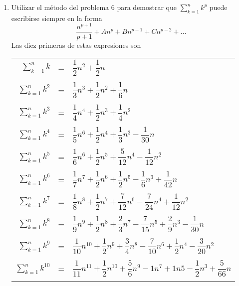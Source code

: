 \begin{enumerate}[\bfseries 1.]
      \item Utilizar el método del problema 6 para demostrar que $\displaystyle\sum_{k=1}^n k^p$ puede escribirse siempre en la forma $$\dfrac{n^{p+1}}{p+1} + An^p + Bn^{p-1} + Cn^{p-2} + ...$$
      Las diez primeras de estas expresiones son
      \begin{center}
      \begin{tabular}{r c l}
      $\displaystyle\sum_{k=1}^n k$&=&$\dfrac{1}{2}n^2 + \dfrac{1}{2}n$\\\\
      $\displaystyle\sum_{k=1}^n k^2$&=&$\dfrac{1}{3} n^3 + \dfrac{1}{2}n^2 + \dfrac{1}{6}n$\\\\
      $\displaystyle\sum_{k=1}^n k^3$&=&$\dfrac{1}{4}n^4 + \dfrac{1}{2} n^3 + \dfrac{1}{4} n^2$\\\\
      $\displaystyle\sum_{k=1}^n k^4$&=&$\dfrac{1}{5} n^6 + \dfrac{1}{2} n^4 + \dfrac{1}{3} n^3 - \dfrac{1}{30}n$\\\\
      $\displaystyle\sum_{k=1}^n k^5$&=&$\dfrac{1}{6}n^6 + \dfrac{1}{2} n^5 + \dfrac{5}{12}n^4 - \dfrac{1}{12}n^2$\\\\
      $\displaystyle\sum_{k=1}^n k^6$&=&$\dfrac{1}{7}n^7 + \dfrac{1}{2}n^6 + \dfrac{1}{2}n^5 - \dfrac{1}{6}n^3 + \dfrac{1}{42}n$\\\\
      $\displaystyle\sum_{k=1}^n k^7$&=&$\dfrac{1}{8}n^8 + \dfrac{1}{2}n^7 + \dfrac{7}{12}n^6 - \dfrac{7}{24}n^4 + \dfrac{1}{12}n^2$\\\\
      $\displaystyle\sum_{k=1}^n k^8$&=&$\dfrac{1}{9}n^9 + \dfrac{1}{2}n^8 + \dfrac{2}{3}n^7 - \dfrac{7}{15}n^5 + \dfrac{2}{9}n^3 - \dfrac{1}{30}n$\\\\
      $\displaystyle\sum_{k=1}^n k^9$&=&$\dfrac{1}{10}n^{10} + \dfrac{1}{2} n^9 + \dfrac{3}{4}n^8 - \dfrac{7}{10}n^6 + \dfrac{1}{2}n^4 - \dfrac{3}{20} n^2$\\\\
      $\displaystyle\sum_{k=1}^n k^10$&=&$\dfrac{1}{11}n^{11} + \dfrac{1}{2}n^{10} + \dfrac{5}{6}n^9 - 1n^7 + 1n5 - \dfrac{1}{2}n^3 + \dfrac{5}{66}n$\\\\
      \end{tabular}

\end{center}
\end{enumerate}
